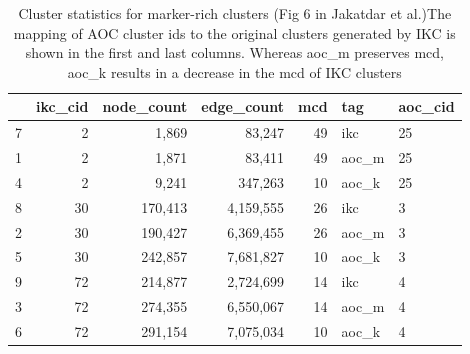 \documentclass[12pt, oneside]{article}   	%
\begin{document}
\begin{table}[ht]
\centering
\begin{tabular}{rrrrrll}
  \hline
 & ikc\_cid & node\_count & edge\_count & mcd & tag & aoc\_cid \\ 
  \hline
7 &   2 & 1,869 & 83,247 &  49 & ikc & 25\\ 
1 &   2 & 1,871 & 83,411 &  49 & aoc\_m & 25\\ 
4 &   2 & 9,241 & 347,263 &  10 & aoc\_k & 25\\ 
8 &  30 & 170,413 & 4,159,555 &  26 & ikc & 3\\ 
2 &  30 & 190,427 & 6,369,455 &  26 & aoc\_m & 3 \\ 
5 &  30 & 242,857 & 7,681,827 &  10 & aoc\_k & 3\\ 
9 &  72 & 214,877 & 2,724,699 &  14 & ikc  & 4\\ 
3 &  72 & 274,355 & 6,550,067 &  14 & aoc\_m & 4 \\ 
6 &  72 & 291,154 & 7,075,034 &  10 & aoc\_k & 4\\ 
   \hline
\end{tabular}
\caption{Cluster statistics for marker-rich clusters (Fig 6 in Jakatdar et al.)The mapping of AOC cluster ids to the original clusters generated by IKC is shown in the first and last columns. Whereas aoc\_m preserves
mcd, aoc\_k results in a decrease in the mcd of IKC clusters }
\end{table}






\end{document}
